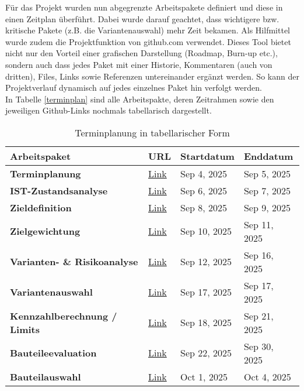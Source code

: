 Für das Projekt wurden nun abgegrenzte Arbeitspakete definiert und diese in einen Zeitplan überführt. Dabei wurde darauf geachtet, dass wichtigere bzw. kritische Pakete (z.B. die Variantenauswahl) mehr Zeit bekamen. Als Hilfmittel wurde zudem die Projektfunktion von github.com verwendet. Dieses Tool bietet nicht nur den Vorteil einer grafischen Darstellung (Roadmap, Burn-up etc.), sondern auch dass jedes Paket mit einer Historie, Kommentaren (auch von dritten), Files, Links sowie Referenzen untereinander ergänzt werden. So kann der Projektverlauf dynamisch auf jedes einzelnes Paket hin verfolgt werden.\\In Tabelle \ref{terminplan} sind alle Arbeitspakte, deren Zeitrahmen sowie den jeweiligen Github-Links nochmals tabellarisch dargestellt.
\begin{table}[H]
	\centering
	\caption{Terminplanung in tabellarischer Form}
	\begin{tabularx}{412pt}{|l|l|l|l|}
		\textbf{Arbeitspaket} & \textbf{URL} & \textbf{Startdatum} & \textbf{Enddatum} \\\hline
		\textbf{Terminplanung} & \href{https://github.com/Violabitch5/Nathophone\_doc/issues/1}{Link} & Sep 4, 2025 & Sep 5, 2025 \\ 
		\textbf{IST-Zustandsanalyse} & \href{https://github.com/Violabitch5/Nathophone\_doc/issues/4}{Link} & Sep 6, 2025 & Sep 7, 2025 \\ 
		\textbf{Zieldefinition} & \href{https://github.com/Violabitch5/Nathophone\_doc/issues/3}{Link} & Sep 8, 2025 & Sep 9, 2025 \\ 
		\textbf{Zielgewichtung} & \href{https://github.com/Violabitch5/Nathophone\_doc/issues/5}{Link} & Sep 10, 2025 & Sep 11, 2025 \\ 
		\textbf{Varianten- \& Risikoanalyse} & \href{https://github.com/Violabitch5/Nathophone\_doc/issues/6}{Link} & Sep 12, 2025 & Sep 16, 2025 \\ 
		\textbf{Variantenauswahl} & \href{https://github.com/Violabitch5/Nathophone\_doc/issues/7}{Link} & Sep 17, 2025 & Sep 17, 2025 \\ 
		\hdashline
		\textbf{Kennzahlberechnung / Limits} & \href{https://github.com/Violabitch5/Nathophone\_elec/issues/1}{Link} & Sep 18, 2025 & Sep 21, 2025 \\ 
		\textbf{Bauteileevaluation} & \href{https://github.com/Violabitch5/Nathophone\_elec/issues/2}{Link} & Sep 22, 2025 & Sep 30, 2025 \\ 
		\textbf{Bauteilauswahl} & \href{https://github.com/Violabitch5/Nathophone\_elec/issues/3}{Link} & Oct 1, 2025 & Oct 4, 2025 \\ 

\end{tabularx}
\end{table}
